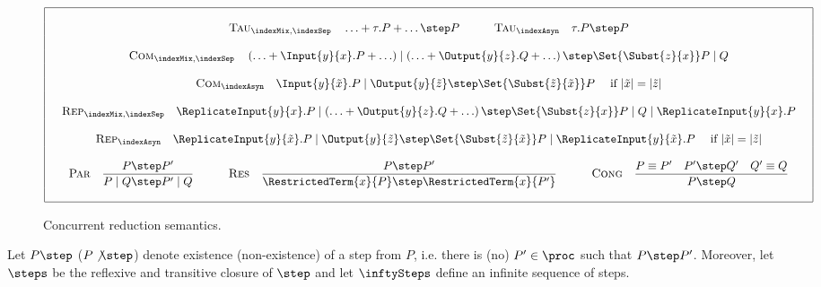 \documentclass[]{llncs}
\begin{document}
\begin{figure}[htp]
	\begin{align*}
		\begin{array}{|c|}
			\hline
			\\
			\quad \textsc{Tau}_{\indexMix, \indexSep} \quad \ldots + \tau.P + \ldots \step P \hspace*{3em} \textsc{Tau}_{\indexAsyn} \quad \tau.P \step P \quad\\
			\\
			\quad \textsc{Com}_{\indexMix, \indexSep} \quad \left( \ldots + \Input{y}{x}.P + \ldots \right) \mid \left( \ldots + \Output{y}{z}.Q + \ldots \right) \step \Set{ \Subst{z}{x} }P \mid Q \quad\\
			\\
			\quad \textsc{Com}_{\indexAsyn} \quad \Input{y}{\tilde{x}}.P \mid \Output{y}{\tilde{z}} \step \Set{ \Subst{\tilde{z}}{\tilde{x}} }P \quad \text{ if } |\tilde{x}| = |\tilde{z}| \quad\\
			\\
			\quad \textsc{Rep}_{\indexMix, \indexSep} \quad \ReplicateInput{y}{x}.P \mid \left( \ldots + \Output{y}{z}.Q + \ldots \right) \step \Set{ \Subst{z}{x} }P \mid Q \mid \ReplicateInput{y}{x}.P \quad\\
			\\
			\quad \textsc{Rep}_{\indexAsyn} \quad \ReplicateInput{y}{\tilde{x}}.P \mid \Output{y}{\tilde{z}} \step \Set{ \Subst{\tilde{z}}{\tilde{x}} }P \mid \ReplicateInput{y}{\tilde{x}}.P \quad \text{ if } |\tilde{x}| = |\tilde{z}| \quad\\
			\\
			\quad \textsc{Par} \quad \dfrac{P \step P'}{P \mid Q \step P' \mid Q} \hspace*{3em} \textsc{Res} \quad \dfrac{P \step P'}{\RestrictedTerm{x}{P} \step \RestrictedTerm{x}{P'}} \hspace*{3em} \textsc{Cong} \quad \dfrac{P \equiv P' \quad P' \step Q' \quad Q' \equiv Q}{P \step Q} \quad\\
			\\
			\hline
		\end{array}
	\end{align*}
	\caption{Concurrent reduction semantics.} \label{fig:concurrentReductionSemantics}
\end{figure}

Let $ P \step $ ($ P \not\step $) denote existence (non-existence) of a step from $ P $, i.e. there is (no) $ P' \in \proc $ such that $ P \step P' $. Moreover, let $ \steps $ be the reflexive and transitive closure of $ \step $ and let $ \inftySteps $ define an infinite sequence of steps.
\end{document}

